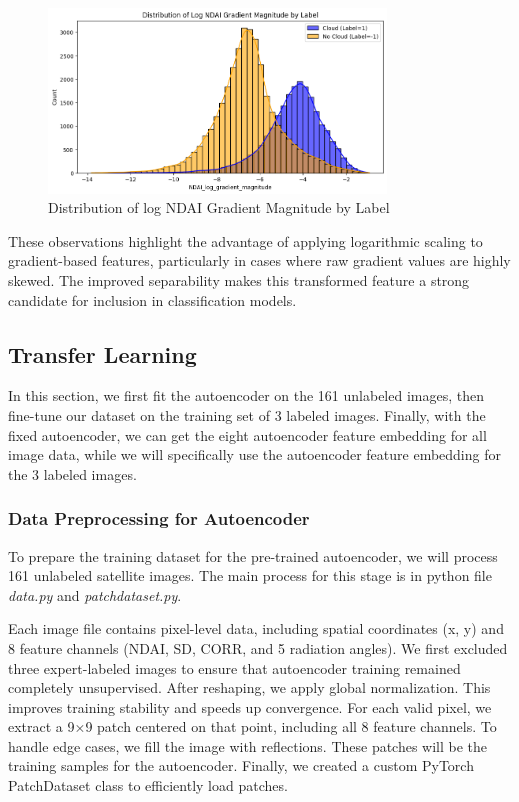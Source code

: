 \documentclass[10pt,letterpaper]{article}
\begin{document}
\begin{figure}[H]
    \centering
    \includegraphics[width=0.8\textwidth]{dist_of_log_NDAI_grad.png}
    \caption{Distribution of log NDAI Gradient Magnitude by Label}
    \label{Figure 6}
\end{figure}

These observations highlight the advantage of applying logarithmic scaling to gradient-based features, particularly in cases where raw gradient values are highly skewed. The improved separability makes this transformed feature a strong candidate for inclusion in classification models.

\subsection{Transfer Learning}

In this section, we first fit the autoencoder on the 161 unlabeled images, then fine-tune our dataset on the training set of 3 labeled images. Finally, with the fixed autoencoder, we can get the eight autoencoder feature embedding for all image data, while we will specifically use the autoencoder feature embedding for the 3 labeled images.

\subsubsection{Data Preprocessing for Autoencoder}

To prepare the training dataset for the pre-trained autoencoder, we will process 161 unlabeled satellite images. The main process for this stage is in python file \textit{data.py} and \textit{patchdataset.py}. 



Each image file contains pixel-level data, including spatial coordinates (x, y) and 8 feature channels (NDAI, SD, CORR, and 5 radiation angles). We first excluded three expert-labeled images to ensure that autoencoder training remained completely unsupervised. After reshaping, we apply global normalization. This improves training stability and speeds up convergence. For each valid pixel, we extract a 9×9 patch centered on that point, including all 8 feature channels. To handle edge cases, we fill the image with reflections. These patches will be the training samples for the autoencoder. Finally, we created a custom PyTorch PatchDataset class to efficiently load patches.
\end{document}
